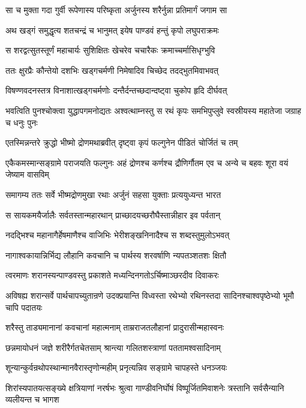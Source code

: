 \twolineshloka
{सा च मुक्ता गदा गुर्वी रूपेणास्य परिष्कृता}
{अर्जुनस्य शरैर्नुन्ना प्रतिमार्गं जगाम सा}


\twolineshloka
{अथ खड्गं समुद्धृत्य शतचन्द्रं च भानुमत्}
{इयेष पाण्डवं हन्तुं कृपो लघुपराक्रमः}


\twolineshloka
{स शरद्वत्सुतस्तूर्णं महाचार्यः सुशिक्षितः}
{खेचरेव चचारैकः क्रमाच्चर्मासिधृग्भुवि}


\twolineshloka
{ततः क्षुरप्रैः कौन्तेयो दशभिः खड्गचर्मणी}
{निमेषादिव चिच्छेद तदद्भुतमिवाभवत्}


\twolineshloka
{विषण्णवदनस्तत्र विनाशात्खड्गचर्मणोः}
{दन्तैर्दन्तच्छदान्दष्ट्वा चुकोप हृदि दीर्घवत्}


\threelineshloka
{भवत्विति पुनश्चोक्त्वा युद्धापगमनोद्यतः}
{अश्वत्थाम्नस्तु स रथं कृपः समभिपुप्लुवे}
{स्वस्रीयस्य महातेजा जग्राह च धनुः पुनः}


\twolineshloka
{एतस्मिन्नन्तरे क्रुद्धो भीष्मो द्रोणमथाब्रवीत्}
{दृष्ट्वा कृपं फल्गुनेन पीडितं चोर्जितं च तम्}


\threelineshloka
{एकैकमस्मान्सङ्ग्रामे पराजयति फल्गुनः}
{अहं द्रोणश्च कर्णश्च द्रौणिर्गौतम एव च}
{अन्ये च बहवः शूरा वयं जेष्याम वासविम्}


\twolineshloka
{समागम्य ततः सर्वे भीष्मद्रोणमुखा रथाः}
{अर्जुनं सहसा युक्ताः प्रत्ययुध्यन्त भारत}


\twolineshloka
{स सायकमयैर्जालैः सर्वतस्तान्महारथान्}
{प्राच्छादयच्छरौघैस्तान्नीहार इव पर्वतान्}


\twolineshloka
{नदद्भिश्च महानागैर्हेषमाणैश्च वाजिभिः}
{भेरीशङ्खनिनादैश्च स शब्दस्तुमुलोऽभवत्}


\twolineshloka
{नागाश्वकायान्निर्भिद्य लौहानि कवचानि च}
{पार्थस्य शरवर्षाणि न्यपतञ्शतशः क्षितौ}


\twolineshloka
{त्वरमाणः शरानस्यन्पाण्डवस्तु प्रकाशते}
{मध्यन्दिनगतोऽर्चिष्माञ्छरदीव दिवाकरः}


\threelineshloka
{अविषह्य शरान्सर्वे पार्थचापच्युतान्रणे}
{उदक्प्रयान्ति विध्वस्ता रथेभ्यो रथिनस्तदा}
{सादिनश्चाश्वपृष्ठेभ्यो भूमौ चापि पदातयः}


\twolineshloka
{शरैस्तु ताड्यमानानां कवचानां महात्मनाम्}
{ताम्रराजतलौहानां प्रादुरासीन्महास्वनः}


\twolineshloka
{छन्नमायोधनं जज्ञे शरीरैर्गतचेतसाम्}
{श्रान्त्या गलितशस्त्राणां पततामश्वसादिनाम्}


\twolineshloka
{शून्यान्कुर्वन्रथोपस्थान्मानवैरास्तृणोन्महीम्}
{प्रनृत्यन्निव सङ्ग्रामे चापहस्ते धनञ्जयः}


\threelineshloka
{शिरांस्यपातयत्सङ्ख्ये क्षत्रियाणां नरर्षभः}
{श्रुत्वा गाण्डीवनिर्घोषं विष्पूर्जितमिवाशनेः}
{त्रस्तानि सर्वसैन्यानि व्यलीयन्त च भागश}


